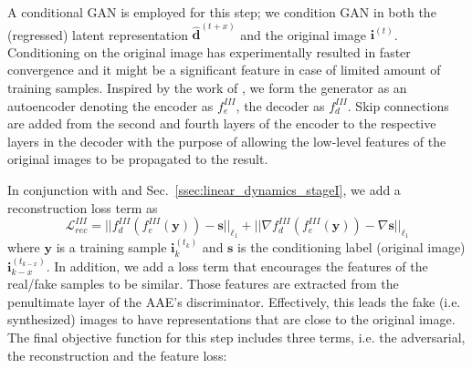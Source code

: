 \documentclass[10pt,twocolumn,letterpaper]{article}
\begin{document}
A conditional GAN is employed for this step; we condition GAN in both the (regressed) latent representation $\hat{\bm{d}}^{(t + x)}$ and the original image $\bm{i}^{(t)}$. Conditioning on the original image has experimentally resulted in faster convergence and it might be a significant feature in case of limited amount of training samples. Inspired by the work of \cite{isola2016image}, we form the generator as an autoencoder denoting the encoder as $f_e^{III}$, the decoder as $f_d^{III}$. Skip connections are added from the second and fourth layers of the encoder to the respective layers in the decoder with the purpose of allowing the low-level features of the original images to be propagated to the result. 

In conjunction with \cite{isola2016image} and Sec.~\ref{ssec:linear_dynamics_stageI}, we add a reconstruction loss term as 
\begin{equation}
    \mathcal{L}_{rec}^{III} = ||f_d^{III}(f_e^{III}(\bm{y})) - \bm{s}||_{\ell_1} + ||\nabla f_d^{III}(f_e^{III}(\bm{y})) - \nabla \bm{s}||_{\ell_1}
    \label{eq:linear_dynamics_stageIII_recloss}
\end{equation}
where $\bm{y}$ is a training sample $\bm{i}_k^{(t_k)}$ and $\bm{s}$ is the conditioning label (original image) $\bm{i}_{k - x}^{(t_{k - x})}$.
In addition, we add a loss term that encourages the features of the real/fake samples to be similar. Those features are extracted from the penultimate layer of the AAE's discriminator. Effectively, this leads the fake (i.e. synthesized) images to have representations that are close to the original image. 
The final objective function for this step includes three terms, i.e. the adversarial, the reconstruction and the feature loss:
\end{document}
